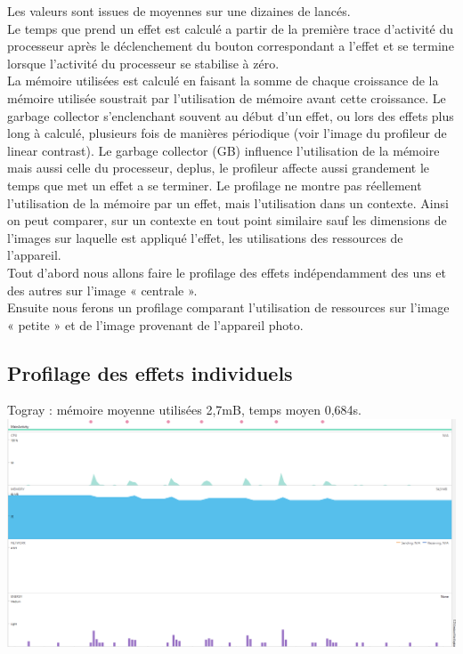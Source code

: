 \documentclass[12pt]{article}
\begin{document}
\begin{itemize}
    Les valeurs sont issues de moyennes sur une dizaines de lancés. \\
    Le temps que prend un effet est calculé a partir de la première trace d’activité du processeur après le déclenchement du bouton correspondant a l’effet et se termine lorsque l’activité du processeur se stabilise à zéro.\\
    La mémoire utilisées est calculé en faisant la somme de chaque  croissance de la mémoire utilisée soustrait par l’utilisation de mémoire avant cette croissance. Le garbage collector s’enclenchant souvent au début d’un effet, ou lors des effets plus long à calculé, plusieurs fois de manières périodique (voir l’image du profileur de linear contrast). Le garbage collector (GB) influence l’utilisation de la mémoire mais aussi celle du processeur, deplus, le profileur affecte aussi grandement le temps que met un effet a se terminer. Le profilage ne montre pas réellement l’utilisation de la mémoire par un effet, mais l’utilisation dans un contexte. Ainsi on peut comparer, sur un contexte en tout point similaire sauf les dimensions de l’images sur laquelle est appliqué l’effet, les utilisations des ressources de l’appareil.\\
   
 Tout d’abord nous allons faire le profilage des effets indépendamment des uns et des autres sur l’image « centrale ». \\
    Ensuite nous ferons un profilage comparant l’utilisation de ressources sur l’image « petite » et de l’image provenant de l’appareil photo.\\

 \bigskip
 \bigskip
 \bigskip
 \bigskip
 \bigskip
 \bigskip
 \bigskip
 \bigskip

 \bigskip




   \subsection{Profilage des effets individuels} 

 \bigskip


    Togray : mémoire moyenne utilisées 2,7mB, temps moyen 0,684s.\\




\includegraphics[width=\textwidth]{1-togray}\\



\end{itemize}
\end{document}
